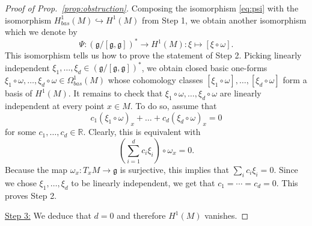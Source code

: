 \documentclass[11pt, letterpaper, oneside,reqno]{amsart}
\theoremstyle{plain}
\theoremstyle{underline}
\theoremstyle{definition}
\theoremstyle{remark}
\begin{document}
\begin{proof}[Proof of Prop.~\ref{prop:obstruction}]
\vspace{0.1cm}
Composing the isomorphism \eqref{eq:psi} with the isomorphism $H^{1}_{bas}(M)\hookrightarrow H^{1}(M)$ from Step 1, we obtain another isomorphism which we denote by
\[
\Psi:(\mathfrak{g}/[\mathfrak{g},\mathfrak{g}])^{*}\longrightarrow H^{1}(M):\xi\mapsto [\xi\circ\omega].
\]  
This isomorphism tells us how to prove the statement of Step 2. Picking linearly independent $\xi_1,\ldots,\xi_d\in(\mathfrak{g}/[\mathfrak{g},\mathfrak{g}])^{*}$, we obtain closed basic one-forms $\xi_1\circ\omega,\ldots,\xi_d\circ\omega\in\Omega^{1}_{bas}(M)$ whose cohomology classes $[\xi_1\circ\omega],\ldots,[\xi_d\circ\omega]$ form a basis of $H^{1}(M)$. It remains to check that $\xi_1\circ\omega,\ldots,\xi_d\circ\omega$ are linearly independent at every point $x\in M$. To do so, assume that
\[
c_1(\xi_1\circ\omega)_x+\ldots+c_d(\xi_d\circ\omega)_x=0
\]
for some $c_1,\ldots,c_d\in\mathbb{R}$. Clearly, this is equivalent with
\[
\left(\sum_{i=1}^{d}c_i\xi_i\right)\circ\omega_x=0.
\]
Because the map $\omega_x:T_{x}M\rightarrow\mathfrak{g}$ is surjective, this implies that $\sum_i c_i\xi_i=0$. Since we chose $\xi_1,\ldots,\xi_d$ to be linearly independent, we get that $c_1=\cdots=c_d=0$. This proves Step 2.

\vspace{0.2cm}
\noindent
\underline{Step 3:} We deduce that $d=0$ and therefore $H^{1}(M)$ vanishes.


\end{proof}
\end{document}
